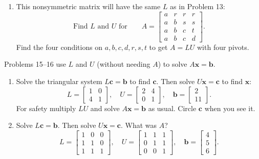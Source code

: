 \documentclass[14pt, a4paper]{article}
\begin{document}
\begin{enumerate}
    \item This nonsymmetric matrix will have the same $L$ as in Problem 13:
          \[
              \text{Find } L \text{ and } U \text{ for}\qquad
              A = \begin{bmatrix}
                  a & r & r & r \\
                  a & b & s & s \\
                  a & b & c & t \\
                  a & b & c & d
              \end{bmatrix}.
          \]
          Find the four conditions on $a,b,c,d,r,s,t$ to get $A = LU$ with four pivots.
\end{enumerate}
\noindent Problems 15--16 use $L$ and $U$ (without needing $A$) to solve $A\boldsymbol{x} = \boldsymbol{b}$.
\begin{enumerate}[resume]

    \item Solve the triangular system $L\boldsymbol{c} = \boldsymbol{b}$ to find $\boldsymbol{c}$. Then solve $U\boldsymbol{x} = \boldsymbol{c}$ to find $\boldsymbol{x}$:
          \[
              L = \begin{bmatrix} 1 & 0 \\ 4 & 1 \end{bmatrix},
              \quad
              U = \begin{bmatrix} 2 & 4 \\ 0 & 1 \end{bmatrix},
              \quad
              \boldsymbol{b} = \begin{bmatrix} 2 \\ 11 \end{bmatrix}.
          \]
          For safety multiply $LU$ and solve $A\boldsymbol{x} = \boldsymbol{b}$ as usual. Circle $\boldsymbol{c}$ when you see it.

    \item Solve $L\boldsymbol{c} = \boldsymbol{b}$. Then solve $U\boldsymbol{x} = \boldsymbol{c}$. What was $A$?
          \[
              L = \begin{bmatrix} 1 & 0 & 0 \\ 1 & 1 & 0 \\ 1 & 1 & 1 \end{bmatrix},
              \quad
              U = \begin{bmatrix} 1 & 1 & 1 \\ 0 & 1 & 1 \\ 0 & 0 & 1 \end{bmatrix},
              \quad
              \boldsymbol{b} = \begin{bmatrix} 4 \\ 5 \\ 6 \end{bmatrix}.
          \]


\end{enumerate}
\end{document}
